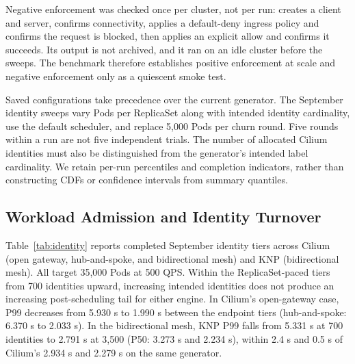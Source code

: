 \documentclass[letterpaper,twocolumn,10pt]{article}
\newcommand{\sys}{\textsc{KNP}}
\begin{document}
Negative enforcement was checked once per cluster, not per run:
 creates a client and server, confirms
connectivity, applies a default-deny ingress policy and confirms the
request is blocked, then applies an explicit allow and confirms it
succeeds. Its output is not archived, and it ran on an idle cluster
before the sweeps. The benchmark therefore establishes positive
enforcement at scale and negative enforcement only as a quiescent smoke
test.

Saved configurations take precedence over the current generator. The
September identity sweeps vary Pods per ReplicaSet along with intended
identity cardinality, use the default scheduler, and replace 5,000 Pods
per churn round. Five rounds within a run are not five independent trials.
The number of allocated Cilium identities must also be distinguished
from the generator's intended label cardinality. We retain per-run
percentiles and completion indicators, rather than constructing CDFs
or confidence intervals from summary quantiles.

\subsection{Workload Admission and Identity Turnover}
Table~\ref{tab:identity} reports completed September identity tiers
across Cilium (open gateway, hub-and-spoke, and bidirectional mesh) and
\sys{} (bidirectional mesh). All target 35,000 Pods at 500 QPS.
Within the ReplicaSet-paced tiers from 700 identities upward, increasing
intended identities does not produce an increasing post-scheduling tail
for either engine. In Cilium's open-gateway case, P99 decreases from
5.930 s to 1.990 s between the endpoint tiers (hub-and-spoke: 6.370 s to
2.033 s). In the bidirectional mesh, \sys{} P99 falls from 5.331 s at 700
identities to 2.791 s at 3,500 (P50: 3.273 s and 2.234 s), within 2.4 s
and 0.5 s of Cilium's 2.934 s and 2.279 s on the same generator.
\end{document}
